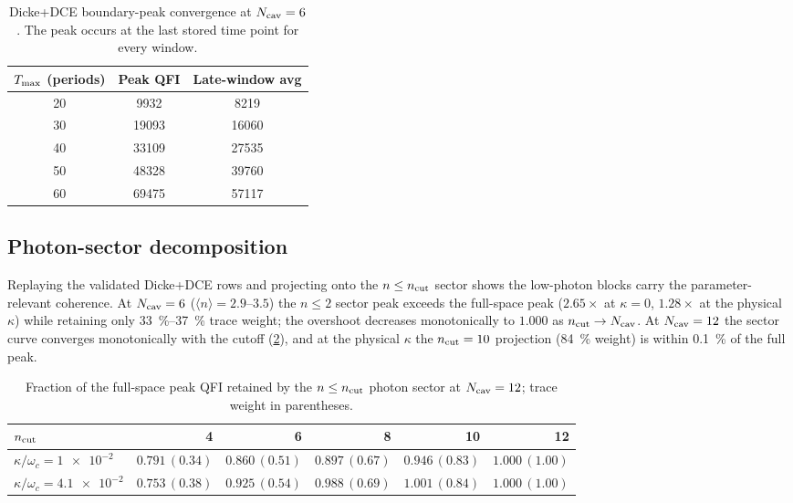\documentclass[aps,prxquantum,preprint,superscriptaddress,amsmath,amssymb]{revtex4-2}
\begin{document}
\begin{table}[hbt!]
\centering
\caption{Dicke+DCE boundary-peak convergence at $N_{\rm cav}=\num{6}$. The peak occurs at the last stored time point for every window.}
\label{tab:si_dicke_convergence}
\begin{tabular}{c c c}
\toprule
{$T_{\rm max}$ (periods)} & {Peak QFI} & {Late-window avg} \\
\midrule
\num{20} & \num{9932}  & \num{8219}  \\
\num{30} & \num{19093} & \num{16060} \\
\num{40} & \num{33109} & \num{27535} \\
\num{50} & \num{48328} & \num{39760} \\
\num{60} & \num{69475} & \num{57117} \\
\bottomrule
\end{tabular}
\end{table}

\subsection{Photon-sector decomposition}

Replaying the validated Dicke+DCE rows and projecting onto the $n\le n_{\rm cut}$ sector shows the low-photon blocks carry the parameter-relevant coherence. At $N_{\rm cav}=\num{6}$ ($\langle n\rangle=\num{2.9}$--$\num{3.5}$) the $n\le\num{2}$ sector peak exceeds the full-space peak ($\num{2.65}\times$ at $\kappa=0$, $\num{1.28}\times$ at the physical $\kappa$) while retaining only \qty{33}{\percent}--\qty{37}{\percent} trace weight; the overshoot decreases monotonically to $1.000$ as $n_{\rm cut}\to N_{\rm cav}$. At $N_{\rm cav}=\num{12}$ the sector curve converges monotonically with the cutoff (\cref{tab:si_photon_sector}), and at the physical $\kappa$ the $n_{\rm cut}=\num{10}$ projection (\qty{84}{\percent} weight) is within \qty{0.1}{\percent} of the full peak.

\begin{table}[hbt!]
\centering
\caption{Fraction of the full-space peak QFI retained by the $n\le n_{\rm cut}$ photon sector at $N_{\rm cav}=\num{12}$; trace weight in parentheses.}
\label{tab:si_photon_sector}
\begin{tabular}{lrrrrr}
\toprule
$n_{\rm cut}$ & \num{4} & \num{6} & \num{8} & \num{10} & \num{12} \\
\midrule
$\kappa/\omega_c=\num{1e-2}$ & $0.791\,(0.34)$ & $0.860\,(0.51)$ & $0.897\,(0.67)$ & $0.946\,(0.83)$ & $1.000\,(1.00)$ \\
$\kappa/\omega_c=\num{4.1e-2}$ & $0.753\,(0.38)$ & $0.925\,(0.54)$ & $0.988\,(0.69)$ & $1.001\,(0.84)$ & $1.000\,(1.00)$ \\
\bottomrule
\end{tabular}
\end{table}
\end{document}
